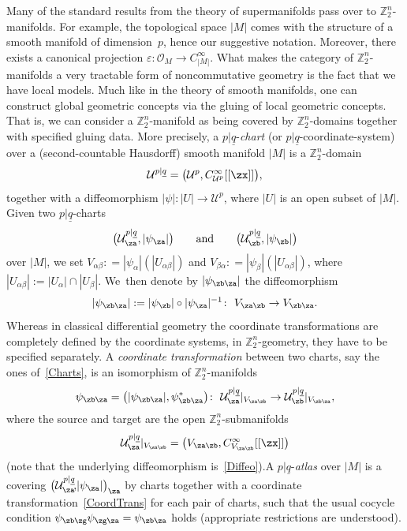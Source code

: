 \documentclass[pdftex]{sigma}%
\newcommand{\Z}{{\mathbb Z}}
\def\ul{\underline}
\def\cO{\mathcal{O}}
\def\cU{\mathcal{U}}
\def\ul{\underline}
\newcommand{\0}{\otimes}
\numberwithin{equation}{section}
\begin{document}
Many of the standard results from the theory of supermanifolds pass over to $\Z_2^n$-manifolds. For example, the topological space $|M|$ comes with the structure of a smooth manifold of dimension~$p$, hence our suggestive notation. Moreover, there exists a canonical projection $\varepsilon \colon \cO_M \rightarrow C_{|M|}^{\infty}$. What makes the category of $\Z_{2}^{n}$-manifolds a very tractable form of noncommutative geometry is the fact that we have local models. Much like in the theory of smooth manifolds, one can construct global geometric concepts via the gluing of local geometric concepts. That is, we can consider a $\Z_{2}^{n}$-manifold as being covered by $\Z_2^n$-domains together with specified gluing data. More precisely, a $p|\ul q$-\emph{chart} (or $p|\ul q$-coordinate-system) over a (second-countable Hausdorff) smooth manifold $|M|$ is a $\Z_2^n$-domain
\[
\mathcal{U}^{p|\ul q}=\big(\cU^p,C^\infty_{\cU^p}[[\zx]]\big),
\]
together with a diffeomorphism $|\psi|\colon |U|\to \cU^p$, where $|U|$ is an open subset of $|M|$. Given two $p|\ul q$-charts
%
 \begin{gather}\label{Charts}
\big(\mathcal{U}^{p|\ul q}_\za,|\psi_\za|\big)\qquad\text{and}\qquad
\big(\mathcal{U}^{p|\ul q}_\zb,|\psi_\zb|\big)
 \end{gather}
 over $|M|$, we set $V_{\alpha \beta} : = |\psi_\alpha|(|U_{\alpha \beta}|)$ and $V_{ \beta \alpha} : = |\psi_\beta|(|U_{\alpha \beta}|)$, where $|U_{\alpha \beta}| := |U_{\alpha}|\cap |U_{\beta}| $. We~then denote by $|\psi_{\zb\za}|$ the diffeomorphism
 \begin{gather}\label{Diffeo}
 |\psi_{\zb\za}|:=|\psi_\zb|\circ|\psi_\za|^{-1}\colon\ V_{\za\zb} \to V_{\zb\za}.
 \end{gather}
%
Whereas in classical differential geometry the coordinate transformations are completely defined by the coordinate systems, in $\Z_2^n$-geometry, they have to be specified separately. A \emph{coordinate transformation} between two charts, say the ones of~\eqref{Charts}, is an isomorphism of $\Z_2^n$-manifolds
\begin{gather}\label{CoordTrans}
\psi_{\zb\za}=\big(|\psi_{\zb\za}|,\psi^*_{\zb\za}\big)\colon\ \mathcal{ U}^{p|\ul q}_{\za}|_{V_{\za\zb}}\to \mathcal{ U}^{p|\ul q}_{\zb}|_{V_{\zb\za}},
\end{gather}
where the source and target are the open $\Z_2^n$-submanifolds
\[
\cU^{p|\ul q}_\za|_{V_{\za\zb}}=\big(V_{\za\zb}, C^\infty_{V_{\za\zb}}[[\zx]]\big)
\]
(note that the underlying diffeomorphism is~\eqref{Diffeo}).\;A $p|\ul q$-\emph{atlas} over $|M|$ is a covering $\big(\mathcal{ U}^{p|\ul q}_\za\!,\!|\psi_\za|\big)_\za$ by charts together with a coordinate transformation~\eqref{CoordTrans} for each pair of charts, such that the usual {cocycle} condition $\psi_{\zb\zg}\psi_{\zg\za}=\psi_{\zb\za}$ holds (appropriate restrictions are understood).
\end{document}
